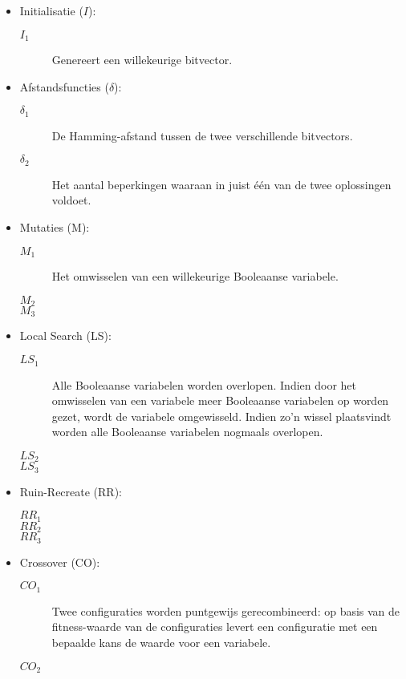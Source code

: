 \begin{itemize}
 \item Initialisatie ($I$):
\begin{description}
 \item [$I_1$] Genereert een willekeurige bitvector.
\end{description}
 \item Afstandsfuncties ($\delta$):
\begin{description}
 \item [$\delta_1$] De Hamming-afstand tussen de twee verschillende bitvectors.
 \item [$\delta_2$] Het aantal beperkingen waaraan in juist \'e\'en van de twee oplossingen voldoet.
\end{description}
 \item Mutaties (M):
\begin{description}
 \item [$M_1$] Het omwisselen van een willekeurige Booleaanse variabele.
 \item [$M_2$] 
 \item [$M_3$] 
\end{description}
 \item Local Search (LS):
\begin{description}
 \item [$LS_1$] Alle Booleaanse variabelen worden overlopen. Indien door het omwisselen van een variabele meer Booleaanse variabelen op \true{} worden gezet, wordt de variabele omgewisseld. Indien zo'n wissel plaatsvindt worden alle Booleaanse variabelen nogmaals overlopen.
 \item [$LS_2$] 
 \item [$LS_3$] 
\end{description}
 \item Ruin-Recreate (RR):
\begin{description}
 \item [$RR_1$] 
 \item [$RR_2$] 
 \item [$RR_3$] 
\end{description}
\item Crossover (CO):
\begin{description}
 \item [$CO_1$] Twee configuraties worden puntgewijs gerecombineerd: op basis van de fitness-waarde van de configuraties levert een configuratie met een bepaalde kans de waarde voor een variabele.
 \item [$CO_2$] 
\end{description}

\end{itemize}
